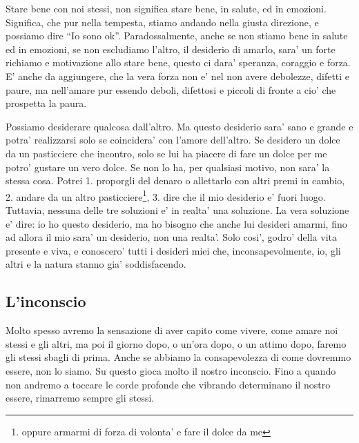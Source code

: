 Stare bene con noi stessi, non significa stare bene, in salute, ed in emozioni. Significa, che pur nella tempesta, stiamo andando nella giusta direzione, e possiamo dire ``Io sono ok''. Paradossalmente, anche se non stiamo bene in salute ed in emozioni, se non escludiamo l'altro, il desiderio di amarlo, sara' un forte richiamo e motivazione allo stare bene, questo ci dara' speranza, coraggio e forza. 
E' anche da aggiungere, che la vera forza non e' nel non avere debolezze, difetti e paure, ma nell'amare pur essendo deboli, difettosi e piccoli di fronte a cio' che prospetta la paura.

Possiamo desiderare qualcosa dall'altro. Ma questo desiderio sara' sano e grande e potra' realizzarsi solo se coincidera' con l'amore dell'altro. Se desidero un dolce da un pasticciere che incontro, solo se lui ha piacere di fare un dolce per me potro' gustare un vero dolce. Se non lo ha, per qualsiasi motivo, non sara' la stessa cosa. Potrei 1. proporgli del denaro o allettarlo con altri premi in cambio, 2. andare da un altro pasticciere\footnote{oppure armarmi di forza di volonta' e fare il dolce da me}, 3. dire che il mio desiderio e' fuori luogo. Tuttavia, nessuna delle tre soluzioni e' in realta' una soluzione. La vera soluzione e' dire: io ho questo desiderio, ma ho bisogno che anche lui desideri amarmi, fino ad allora il mio sara' un desiderio, non una realta'. Solo cosi', godro' della vita presente e viva, e conoscero' tutti i desideri miei che, inconsapevolmente, io, gli altri e la natura stanno gia' soddisfacendo.

\subsection{L'inconscio}

Molto spesso avremo la sensazione di aver capito come vivere, come amare noi stessi e gli altri, ma poi il giorno dopo, o un'ora dopo, o un attimo dopo, faremo gli stessi sbagli di prima. Anche se abbiamo la consapevolezza di come dovremmo essere, non lo siamo. Su questo gioca molto il nostro inconscio. Fino a quando non andremo a toccare le corde profonde che vibrando determinano il nostro essere, rimarremo sempre gli stessi. 

